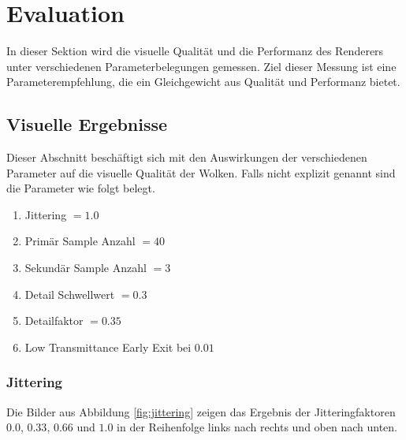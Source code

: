 \section{Evaluation}
\label{sec:evaluation}
In dieser Sektion wird die visuelle Qualität und die Performanz des Renderers unter verschiedenen Parameterbelegungen gemessen. Ziel dieser Messung ist eine Parameterempfehlung, die ein Gleichgewicht aus Qualität und Performanz bietet.

\subsection{Visuelle Ergebnisse}
Dieser Abschnitt beschäftigt sich mit den Auswirkungen der verschiedenen Parameter auf die visuelle Qualität der Wolken. Falls nicht explizit genannt sind die Parameter wie folgt belegt.\\

\begin{enumerate}
    \item Jittering $ = 1.0 $
    \item Primär Sample Anzahl $ = 40 $
    \item Sekundär Sample Anzahl $ = 3 $
    \item Detail Schwellwert $ = 0.3 $
    \item Detailfaktor $ = 0.35 $
    \item Low Transmittance Early Exit bei $ 0.01 $
\end{enumerate}

\subsubsection{Jittering}
Die Bilder aus Abbildung \ref{fig:jittering} zeigen das Ergebnis der Jitteringfaktoren $ 0.0 $, $ 0.33 $, $ 0.66 $ und $ 1.0 $ in der Reihenfolge links nach rechts und oben nach unten.

